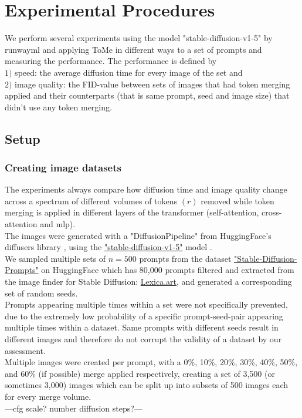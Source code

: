 \section{Experimental Procedures}
We perform several experiments using the model "stable-diffusion-v1-5" by runwayml \cite{Rombach_2022_CVPR} and applying ToMe in different ways to a set of prompts and measuring the performance.
The performance is defined by\\ 
\(1)\) speed: the average diffusion time for every image of the set and\\
\(2)\) image quality: the FID-value between sets of images that had token merging applied and their counterparts (that is same prompt, seed and image size) that didn't use any token merging.



\subsection{Setup}
\subsubsection*{Creating image datasets}
The experiments always compare how diffusion time and image quality change across a spectrum of different volumes of tokens \((r)\) removed while token merging is applied in different layers of the transformer (self-attention, cross-attention and mlp).\\
The images were generated with a "DiffusionPipeline" from HuggingFace's diffusers library \cite{von-platen-etal-2022-diffusers}, using the \href{https://huggingface.co/runwayml/stable-diffusion-v1-5}{"stable-diffusion-v1-5"} model \cite{Rombach_2022_CVPR}.\\
We sampled multiple sets of \(n=500\) prompts from the dataset \href{https://huggingface.co/datasets/Gustavosta/Stable-Diffusion-Prompts}{"Stable-Diffusion-Prompts"} on HuggingFace which has 80,000 prompts filtered and extracted from the image finder for Stable Diffusion: \href{https://lexica.art}{Lexica.art}, and generated a corresponding set of random seeds.\\ 
Prompts appearing multiple times within a set were not specifically prevented, due to the extremely low probability of a specific prompt-seed-pair appearing multiple times within a dataset. Same prompts with different seeds result in different images and therefore do not corrupt the validity of a dataset by our assessment.\\
Multiple images were created per prompt, with a 0\%, 10\%, 20\%, 30\%, 40\%, 50\%, and 60\% (if possible) merge applied respectively, creating a set of 3,500 (or sometimes 3,000) images which can be split up into subsets of 500 images each for every merge volume.\\
---cfg scale? number diffusion steps?---



